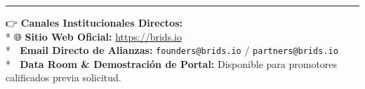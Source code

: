 \documentclass[
]{article}
\begin{document}
\begin{center}\rule{0.5\linewidth}{0.5pt}\end{center}

👉 \textbf{Canales Institucionales Directos:}\\
* 🌐 \textbf{Sitio Web Oficial:} \url{https://brids.io}\\
* 📩 \textbf{Email Directo de Alianzas:} \texttt{founders@brids.io} /
\texttt{partners@brids.io}\\
* 🏢 \textbf{Data Room \& Demostración de Portal:} Disponible para
promotores calificados previa solicitud.
\end{document}
